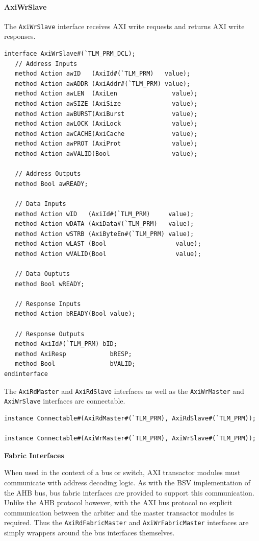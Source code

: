 \documentclass[twoside,letterpaper]{article}
\newcommand{\te}[1]{\texttt{#1}}
\begin{document}
\paragraph{\bf AxiWrSlave} The \te{AxiWrSlave} interface receives AXI 
write requests and returns AXI write responses. 

\begin{verbatim}          
interface AxiWrSlave#(`TLM_PRM_DCL);
   // Address Inputs
   method Action awID   (AxiId#(`TLM_PRM)   value);
   method Action awADDR (AxiAddr#(`TLM_PRM) value);
   method Action awLEN  (AxiLen               value);
   method Action awSIZE (AxiSize              value);
   method Action awBURST(AxiBurst             value);
   method Action awLOCK (AxiLock              value);
   method Action awCACHE(AxiCache             value);
   method Action awPROT (AxiProt              value);   
   method Action awVALID(Bool                 value);
      
   // Address Outputs
   method Bool awREADY;
      
   // Data Inputs
   method Action wID   (AxiId#(`TLM_PRM)     value);
   method Action wDATA (AxiData#(`TLM_PRM)   value);
   method Action wSTRB (AxiByteEn#(`TLM_PRM) value);
   method Action wLAST (Bool                   value);
   method Action wVALID(Bool                   value);
      
   // Data Ouptuts
   method Bool wREADY;
      
   // Response Inputs
   method Action bREADY(Bool value);
      
   // Response Outputs
   method AxiId#(`TLM_PRM) bID;
   method AxiResp            bRESP;
   method Bool               bVALID;
endinterface
\end{verbatim}

The \te{AxiRdMaster} and \te{AxiRdSlave} interfaces as well as the
\te{AxiWrMaster} and \te{AxiWrSlave} interfaces are connectable.

\begin{verbatim}
instance Connectable#(AxiRdMaster#(`TLM_PRM), AxiRdSlave#(`TLM_PRM));

instance Connectable#(AxiWrMaster#(`TLM_PRM), AxiWrSlave#(`TLM_PRM));
\end{verbatim}

{\bf Fabric Interfaces}

When used in the context of a bus or switch, AXI transactor modules
must communicate with address decoding logic. As with the BSV
implementation of the AHB bus, bus fabric interfaces are provided
to support this communication. Unlike the AHB protocol however, with
the AXI bus protocol no explicit communication between the arbiter and
the master transactor modules is required. Thus the
\te{AxiRdFabricMaster} and \te{AxiWrFabricMaster} interfaces are simply 
wrappers around the bus interfaces themselves.
\end{document}
